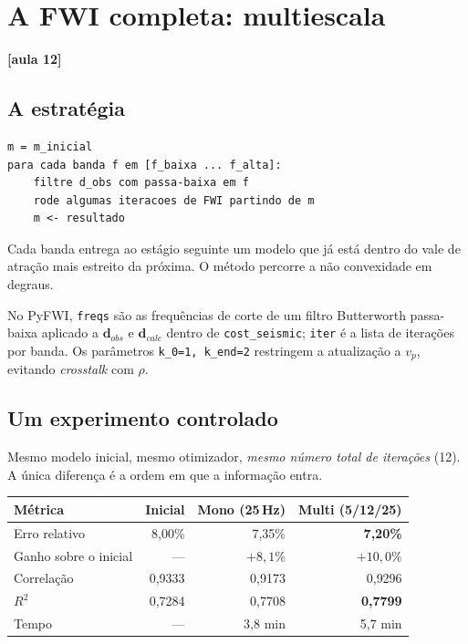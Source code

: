 \documentclass[11pt,a4paper,oneside]{report}
\newcommand{\aula}[1]{\textcolor{cianofwi}{\textbf{[aula #1]}}}
\begin{document}
\chapter{A FWI completa: multiescala}

\aula{12}

\section{A estratégia}

\begin{lstlisting}
m = m_inicial
para cada banda f em [f_baixa ... f_alta]:
    filtre d_obs com passa-baixa em f
    rode algumas iteracoes de FWI partindo de m
    m <- resultado
\end{lstlisting}

Cada banda entrega ao estágio seguinte um modelo que já está dentro do vale
de atração mais estreito da próxima. O método percorre a não convexidade em
degraus.

No PyFWI, \texttt{freqs} são as frequências de corte de um filtro Butterworth
passa-baixa aplicado a $\mathbf{d}_{obs}$ e $\mathbf{d}_{calc}$ dentro de
\texttt{cost\_seismic}; \texttt{iter} é a lista de iterações por banda. Os
parâmetros \texttt{k\_0=1, k\_end=2} restringem a atualização a $v_p$,
evitando \emph{crosstalk} com $\rho$.

\section{Um experimento controlado}

Mesmo modelo inicial, mesmo otimizador, \emph{mesmo número total de
iterações} (12). A única diferença é a ordem em que a informação entra.

\begin{center}
\begin{tabular}{@{}lrrr@{}}
\toprule
\textbf{Métrica} & \textbf{Inicial} & \textbf{Mono (25\,Hz)} & \textbf{Multi (5/12/25)} \\
\midrule
Erro relativo & 8{,}00\% & 7{,}35\% & \textbf{7{,}20\%} \\
Ganho sobre o inicial & --- & $+8{,}1\%$ & $+10{,}0\%$ \\
Correlação & 0{,}9333 & 0{,}9173 & 0{,}9296 \\
$R^{2}$ & 0{,}7284 & 0{,}7708 & \textbf{0{,}7799} \\
Tempo & --- & 3{,}8 min & 5{,}7 min \\
\bottomrule
\end{tabular}
\end{center}
\end{document}

